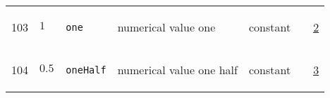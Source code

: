 \begin{longtable}{|p{1cm}|p{2.5cm}|p{4.5cm}|p{8cm}|p{3.0cm}|p{3cm}|p{1cm}|}
            103
             & \hypertarget{"v:103"}{ $ {1}{_{}} $}
             & \verb|one|
             & numerical value one
             & \begin{lay}constant \end{lay}
             & $  $
             &                 \hyperlink{"e:2"}{ 2 }
                 \\
            104
             & \hypertarget{"v:104"}{ $ {0.5}{_{}} $}
             & \verb|oneHalf|
             & numerical value one half
             & \begin{lay}constant \end{lay}
             & $  $
             &                 \hyperlink{"e:3"}{ 3 }
                 \\
    \end{longtable}